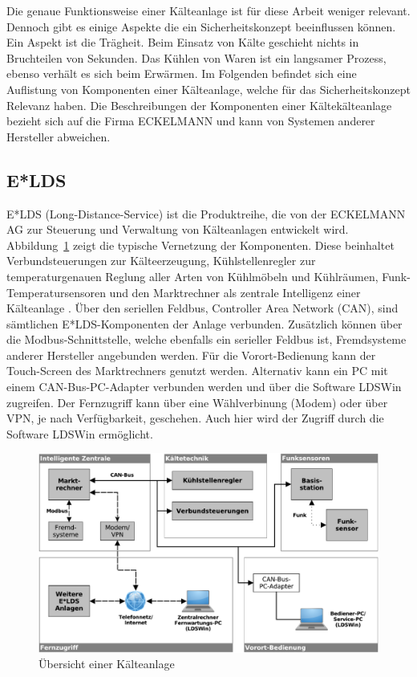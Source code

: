 \documentclass[11pt,a4paper]{report}
\begin{document}
Die genaue Funktionsweise einer Kälteanlage ist für diese Arbeit weniger relevant. Dennoch gibt es einige Aspekte die ein Sicherheitskonzept beeinflussen können. Ein Aspekt ist die Trägheit. Beim Einsatz von Kälte geschieht nichts in Bruchteilen von Sekunden. Das Kühlen von Waren ist ein langsamer Prozess, ebenso verhält es sich beim Erwärmen. Im Folgenden befindet sich eine Auflistung von Komponenten einer Kälteanlage, welche für das Sicherheitskonzept Relevanz haben. Die Beschreibungen der Komponenten einer Kältekälteanlage bezieht sich auf die Firma ECKELMANN und kann von Systemen anderer Hersteller abweichen.

\subsection{E*LDS}

E*LDS (Long-Distance-Service) ist die Produktreihe, die von der ECKELMANN AG zur Steuerung und Verwaltung von Kälteanlagen entwickelt wird. Abbildung~\ref{fig:kaelteanlage} zeigt die typische Vernetzung der Komponenten. Diese beinhaltet Verbundsteuerungen zur Kälteerzeugung, Kühlstellenregler zur temperaturgenauen Reglung aller Arten von Kühlmöbeln und Kühlräumen, Funk-Temperatursensoren und den Marktrechner als zentrale Intelligenz einer Kälteanlage \cite{elds}. Über den seriellen Feldbus, Controller Area Network (CAN), sind sämtlichen E*LDS-Komponenten der Anlage verbunden. Zusätzlich können über die Modbus-Schnittstelle, welche ebenfalls ein serieller Feldbus ist, Fremdsysteme anderer Hersteller angebunden werden. Für die Vorort-Bedienung kann der Touch-Screen des Marktrechners genutzt werden. Alternativ kann ein PC mit einem CAN-Bus-PC-Adapter verbunden werden und über die Software LDSWin zugreifen. Der Fernzugriff kann über eine Wählverbinung (Modem) oder über VPN, je nach Verfügbarkeit, geschehen. Auch hier wird der Zugriff durch die Software LDSWin ermöglicht.

\begin{figure}[htbp]
\centering
\includegraphics[scale=0.65]{images/kaelteanlage_uebersicht.pdf}
\caption{Übersicht einer Kälteanlage}
\label{fig:kaelteanlage}
\end{figure}
\end{document}
